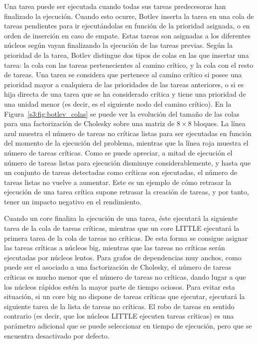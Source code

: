 Una tarea puede ser ejecutada cuando todas sus tareas predecesoras han
finalizado la ejecución. Cuando esto ocurre, Botlev inserta la tarea en una
cola de tareas pendientes para ir ejecutándolas en función de la prioridad
asignada, o en orden de inserción en caso de empate. Estas tareas son
asignadas a los diferentes núcleos según vayan finalizando la ejecución de
las tareas previas. Según la prioridad de la tarea, Botlev distingue dos
tipos de colas en las que insertar una tarea: la cola con las tareas
pertenecientes al camino crítico, y la cola con el resto de tareas. Una
tarea se considera que pertenece al camino crítico si posee una prioridad
mayor a cualquiera de las prioridades de las tareas anteriores, o si es
hija directa de una tarea que se ha considerado crítica y tiene una
prioridad de una unidad menor (es decir, es el siguiente nodo del camino
crítico). En la Figura~\ref{s3:fig:botlev_colas} se puede ver la evolución
del tamaño de las colas para una factorización de Cholesky sobre una matriz
de $8\times8$ bloques. La línea azul muestra el número de tareas no
críticas listas para ser ejecutadas en función del momento de la ejecución
del problema, mientras que la línea roja muestra el número de tareas
críticas. Como se puede apreciar, a mitad de ejecución el número de tareas
listas para ejecución disminuye considerablemente, y hasta que un conjunto
de tareas detectadas como críticas son ejecutadas, el número de tareas
listas no vuelve a aumentar. Este es un ejemplo de cómo retrasar la
ejecución de una tarea crítica supone retrasar la creación de tareas, y por
tanto, tener un impacto negativo en el rendimiento.

Cuando un core \BIG finaliza la ejecución de una tarea, éste ejecutará la
siguiente tarea de la cola de tareas críticas, mientras que un core LITTLE
ejecutará la primera tarea de la cola de tareas no críticas. De esta forma
se consigue asignar las tareas críticas a núcleos big, mientras que las
tareas no críticas serán ejecutadas por núcleos lentos. Para grafos de
dependencias muy anchos, como puede ser el asociado a una factorización de
Cholesky, el número de tareas críticas es mucho menor que el número de
tareas no críticas, dando lugar a que los núcleos rápidos estén la mayor
parte de tiempo ociosos. Para evitar esta situación, si un core big no
dispone de tareas críticas que ejecutar, ejecutará la siguiente tarea de la
lista de tareas no críticas. El robo de tareas en sentido contrario (es
decir, que los núcleos LITTLE ejecuten tareas críticas) es una parámetro
adicional que se puede seleccionar en tiempo de ejecución, pero que se
encuentra desactivado por defecto.




